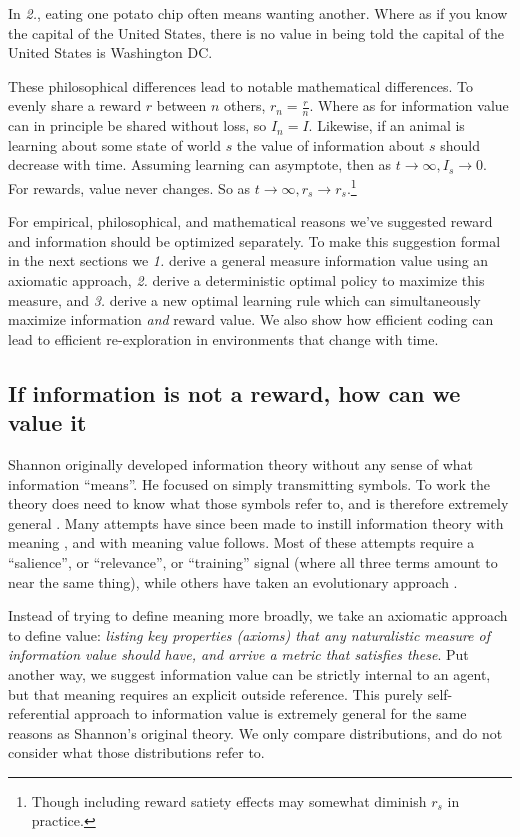 \documentclass[9pt,twocolumn,twoside]{pnas-new}
\begin{document}
In \textit{2.}, eating one potato chip often means wanting another. Where as if you know the capital of the United States, there is no value in being told the capital of the United States is Washington DC.

These philosophical differences lead to notable mathematical differences. To evenly share a reward $r$ between $n$ others, $r_n = \frac{r}{n}$. Where as for information value can in principle be shared without loss, so $I_n = I$. Likewise, if an animal is learning about some state of world $s$ the value of information about $s$ should decrease with time. Assuming learning can asymptote, then as $t \rightarrow \infty, I_s \rightarrow 0$. For rewards, value never changes. So as $t \rightarrow \infty, r_s \rightarrow r_s$.\footnote{Though including reward satiety effects may somewhat diminish $r_s$ in practice.}

For empirical, philosophical, and mathematical reasons we've suggested reward and information should be optimized separately. To make this suggestion formal in the next sections we \textit{1.} derive a general measure information value using an axiomatic approach, \textit{2.} derive a deterministic optimal policy to maximize this measure, and \textit{3.} derive a new optimal learning rule which can simultaneously maximize information \textit{and} reward value. We also show how efficient coding can lead to efficient re-exploration in environments that change with time. 

    
\subsection*{If information is not a reward, how can we value it}
Shannon originally developed information theory without any sense of what information ``means''. He focused on simply transmitting symbols. To work the theory does need to know what those symbols refer to, and is therefore extremely general \citep{Shannon1948}. Many attempts have since been made to instill information theory with meaning \citep{Kolchinsky2018}, and with meaning value follows. Most of these attempts require a ``salience'', or ``relevance'', or ``training'' signal (where all three terms amount to near the same thing), while others have taken an evolutionary approach \citep{Kolchinsky2018}.  

Instead of trying to define meaning more broadly, we take an axiomatic approach to define value: \textit{listing key properties (axioms) that any naturalistic measure of information value should have, and arrive a metric that satisfies these}. Put another way, we suggest information value can be strictly internal to an agent, but that meaning requires an explicit outside reference. This purely self-referential approach to information value is extremely general for the same reasons as Shannon's original theory. We only compare distributions, and do not consider what those distributions refer to.
\end{document}
